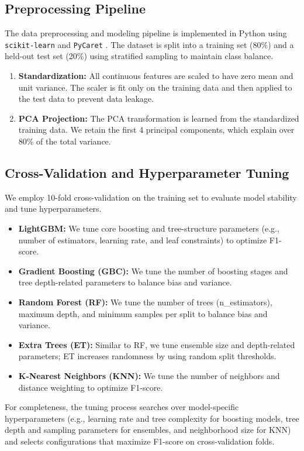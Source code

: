\subsection{Preprocessing Pipeline}
The data preprocessing and modeling pipeline is implemented in Python using \texttt{scikit-learn} \cite{scikit-learn} and \texttt{PyCaret} \cite{pycaret}. The dataset is split into a training set (80\%) and a held-out test set (20\%) using stratified sampling to maintain class balance.
\begin{enumerate}
    \item \textbf{Standardization:} All continuous features are scaled to have zero mean and unit variance. The scaler is fit only on the training data and then applied to the test data to prevent data leakage.
    \item \textbf{PCA Projection:} The PCA transformation is learned from the standardized training data. We retain the first 4 principal components, which explain over 80\% of the total variance.
\end{enumerate}

\subsection{Cross-Validation and Hyperparameter Tuning}
We employ 10-fold cross-validation on the training set to evaluate model stability and tune hyperparameters.
\begin{itemize}
    \item \textbf{LightGBM:} We tune core boosting and tree-structure parameters (e.g., number of estimators, learning rate, and leaf constraints) to optimize F1-score.
    \item \textbf{Gradient Boosting (GBC):} We tune the number of boosting stages and tree depth-related parameters to balance bias and variance.
    \item \textbf{Random Forest (RF):} We tune the number of trees (n\_estimators), maximum depth, and minimum samples per split to balance bias and variance.
    \item \textbf{Extra Trees (ET):} Similar to RF, we tune ensemble size and depth-related parameters; ET increases randomness by using random split thresholds.
    \item \textbf{K-Nearest Neighbors (KNN):} We tune the number of neighbors and distance weighting to optimize F1-score.
\end{itemize}
For completeness, the tuning process searches over model-specific hyperparameters (e.g., learning rate and tree complexity for boosting models, tree depth and sampling parameters for ensembles, and neighborhood size for KNN) and selects configurations that maximize F1-score on cross-validation folds.

